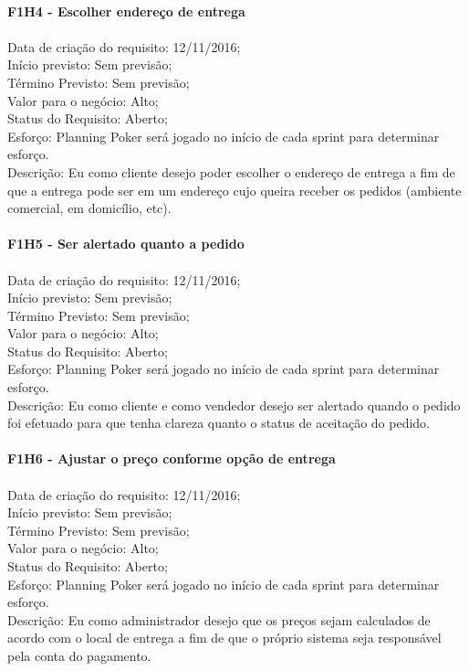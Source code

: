\begin{apendicesenv}
\\
\textbf{F1H4 - Escolher endereço de entrega}\\ \\
\tab Data de criação do requisito: 12/11/2016;\\
\tab Início previsto: Sem previsão;\\
\tab Término Previsto: Sem previsão;\\
\tab Valor para o negócio: Alto;\\
\tab Status do Requisito: Aberto;\\
\tab Esforço: Planning Poker será jogado no início de cada sprint para determinar esforço.\\
\tab Descrição: Eu como cliente desejo poder escolher o endereço de entrega a fim de que a entrega pode ser em um endereço cujo queira receber os pedidos (ambiente comercial, em domicílio, etc).\\
\\
\textbf{F1H5 - Ser alertado quanto a pedido}\\ \\
\tab Data de criação do requisito: 12/11/2016;\\
\tab Início previsto: Sem previsão;\\
\tab Término Previsto: Sem previsão;\\
\tab Valor para o negócio: Alto;\\
\tab Status do Requisito: Aberto;\\
\tab Esforço: Planning Poker será jogado no início de cada sprint para determinar esforço.\\
\tab Descrição: Eu como cliente e como vendedor desejo ser alertado quando o pedido foi efetuado para que tenha clareza quanto o status de aceitação do pedido.\\
\\
\textbf{F1H6 - Ajustar o preço conforme opção de entrega}\\ \\
\tab Data de criação do requisito: 12/11/2016;\\
\tab Início previsto: Sem previsão;\\
\tab Término Previsto: Sem previsão;\\
\tab Valor para o negócio: Alto;\\
\tab Status do Requisito: Aberto;\\
\tab Esforço: Planning Poker será jogado no início de cada sprint para determinar esforço.\\
\tab Descrição: Eu como administrador desejo que os preços sejam calculados de acordo com o local de entrega a fim de que o próprio sistema seja responsável pela conta do pagamento.\\

\end{apendicesenv}

